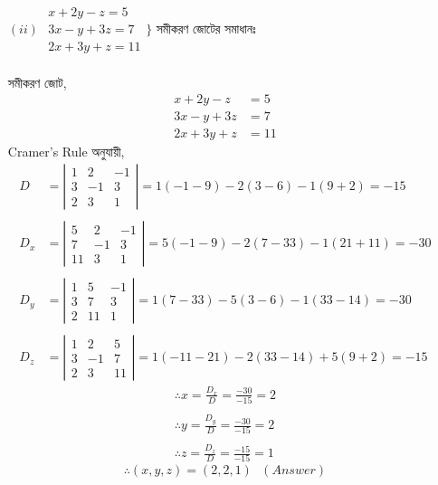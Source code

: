 \begin{itemize}
	\newpage
	\item[$(ii)$] $\begin{array}{r}
	x+2 y-z=5 \\
	3 x-y+3 z=7 \\
	2 x+3 y+z=11
	\end{array}\Bigg\}$ সমীকরণ জোটের সমাধানঃ\\ \\
	সমীকরণ জোট, 
	\begin{align}
		x+2y-z &= 5 \tag{1}\\
		3x-y+3z &= 7 \tag{2}\\
		2x+3y+z &= 11 \tag{3}
	\end{align}
	Cramer's Rule অনুযায়ী,
	\begin{align*}
	D &=\left|\begin{array}{rrr}
	1 & 2 & -1 \\
	3 & -1 & 3 \\
	2 & 3 & 1
	\end{array}\right|= 1(-1-9)-2(3-6)-1(9+2)= -15 \\ \\
	D_{x}&=\left|\begin{array}{rrr}
	5 & 2 & -1 \\
	7 & -1 & 3 \\
	11 & 3 & 1
	\end{array}\right|= 5(-1-9)-2(7-33)-1(21+11)=-30 \\ \\
	D_{y} &=\left|\begin{array}{rrr}
	1 & 5 & -1 \\
	3 & 7 & 3 \\
	2 & 11 & 1
	\end{array}\right|= 1(7-33)-5(3-6)-1(33-14)=-30 \\ \\
	D_{z} &=\left|\begin{array}{rrr}
	1 & 2 & 5 \\
	3 & -1 & 7 \\
	2 & 3 & 11
	\end{array}\right|=1(-11-21)-2(33-14)+5(9+2)=-15 
	\end{align*}
	\begin{align*}
	\therefore x=\frac{D_{x}}{D}=\frac{-30}{-15}=2 \\ \\
	\therefore y=\frac{D_{y}}{D}=\frac{-30}{-15}=2 \\ \\
	\therefore z=\frac{D_{z}}{D}=\frac{-15}{-15}=1
	\end{align*}
	\begin{equation*}
		\therefore (x,y,z) = (2,2,1) \hspace{8pt} (Answer)
	\end{equation*}
\end{itemize}



